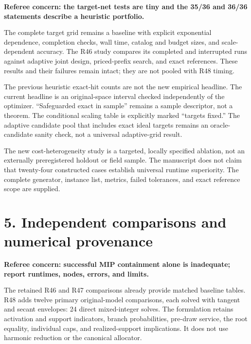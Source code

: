 \documentclass[11pt,letterpaper]{article}
\begin{document}
\textbf{Referee concern: the target-net tests are tiny and the 35/36 and 36/36 statements describe a heuristic portfolio.}



The complete target grid remains a baseline with explicit exponential dependence, completion checks, wall time, catalog and budget sizes, and scale-dependent accuracy. The R46 study compares its completed and interrupted runs against adaptive joint design, priced-prefix search, and exact references. These results and their failures remain intact; they are not pooled with R48 timing.



The previous heuristic exact-hit counts are not the new empirical headline. The current headline is an original-space interval checked independently of the optimizer. “Safeguarded exact in sample” remains a sample descriptor, not a theorem. The conditional scaling table is explicitly marked “targets fixed.” The adaptive candidate pool that includes exact ideal targets remains an oracle-candidate sanity check, not a universal adaptive-grid result.



The new cost-heterogeneity study is a targeted, locally specified ablation, not an externally preregistered holdout or field sample. The manuscript does not claim that twenty-four constructed cases establish universal runtime superiority. The complete generator, instance list, metrics, failed tolerances, and exact reference scope are supplied.



\section*{5. Independent comparisons and numerical provenance}


\textbf{Referee concern: successful MIP containment alone is inadequate; report runtimes, nodes, errors, and limits.}



The retained R46 and R47 comparisons already provide matched baseline tables. R48 adds twelve primary original-model comparisons, each solved with tangent and secant envelopes: 24 direct mixed-integer solves. The formulation retains activation and support indicators, branch probabilities, pre-draw service, the root equality, individual caps, and realized-support implications. It does not use harmonic reduction or the canonical allocator.
\end{document}
